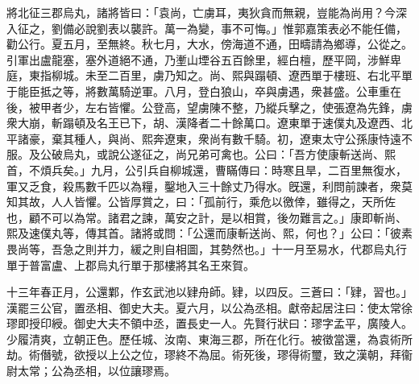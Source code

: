 \begin{pinyinscope}
將北征三郡烏丸，諸將皆曰：「袁尚，亡虜耳，夷狄貪而無親，豈能為尚用？今深入征之，劉備必說劉表以襲許。萬一為變，事不可悔。」惟郭嘉策表必不能任備，勸公行。夏五月，至無終。秋七月，大水，傍海道不通，田疇請為鄉導，公從之。引軍出盧龍塞，塞外道絕不通，乃壍山堙谷五百餘里，經白檀，歷平岡，涉鮮卑庭，東指柳城。未至二百里，虜乃知之。尚、熙與蹋頓、遼西單于樓班、右北平單于能臣抵之等，將數萬騎逆軍。八月，登白狼山，卒與虜遇，衆甚盛。公車重在後，被甲者少，左右皆懼。公登高，望虜陳不整，乃縱兵擊之，使張遼為先鋒，虜衆大崩，斬蹋頓及名王已下，胡、漢降者二十餘萬口。遼東單于速僕丸及遼西、北平諸豪，棄其種人，與尚、熙奔遼東，衆尚有數千騎。初，遼東太守公孫康恃遠不服。及公破烏丸，或說公遂征之，尚兄弟可禽也。公曰：「吾方使康斬送尚、熙首，不煩兵矣。」九月，公引兵自柳城還，曹瞞傳曰：時寒且旱，二百里無復水，軍又乏食，殺馬數千匹以為糧，鑿地入三十餘丈乃得水。旣還，利問前諫者，衆莫知其故，人人皆懼。公皆厚賞之，曰：「孤前行，乘危以徼倖，雖得之，天所佐也，顧不可以為常。諸君之諫，萬安之計，是以相賞，後勿難言之。」康即斬尚、熙及速僕丸等，傳其首。諸將或問：「公還而康斬送尚、熙，何也？」公曰：「彼素畏尚等，吾急之則并力，緩之則自相圖，其勢然也。」十一月至易水，代郡烏丸行單于普富盧、上郡烏丸行單于那樓將其名王來賀。

十三年春正月，公還鄴，作玄武池以肄舟師。肄，以四反。三蒼曰：「肄，習也。」漢罷三公官，置丞相、御史大夫。夏六月，以公為丞相。獻帝起居注曰：使太常徐璆即授印綬。御史大夫不領中丞，置長史一人。先賢行狀曰：璆字孟平，廣陵人。少履清爽，立朝正色。歷任城、汝南、東海三郡，所在化行。被徵當還，為袁術所劫。術僭號，欲授以上公之位，璆終不為屈。術死後，璆得術璽，致之漢朝，拜衞尉太常；公為丞相，以位讓璆焉。


\end{pinyinscope}
